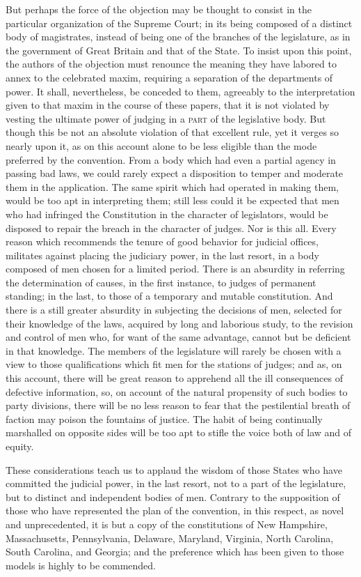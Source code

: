 But perhaps the force of the objection may be thought to consist in the particular organization of the Supreme Court; in its being composed of a distinct body of magistrates, instead of being one of the branches of the legislature, as in the government of Great Britain and that of the State. To insist upon this point, the authors of the objection must renounce the meaning they have labored to annex to the celebrated maxim, requiring a separation of the departments of power. It shall, nevertheless, be conceded to them, agreeably to the interpretation given to that maxim in the course of these papers, that it is not violated by vesting the ultimate power of judging in a \textsc{part }of the legislative body. But though this be not an absolute violation of that excellent rule, yet it verges so nearly upon it, as on this account alone to be less eligible than the mode preferred by the convention. From a body which had even a partial agency in passing bad laws, we could rarely expect a disposition to temper and moderate them in the application. The same spirit which had operated in making them, would be too apt in interpreting them; still less could it be expected that men who had infringed the Constitution in the character of legislators, would be disposed to repair the breach in the character of judges. Nor is this all. Every reason which recommends the tenure of good behavior for judicial offices, militates against placing the judiciary power, in the last resort, in a body composed of men chosen for a limited period. There is an absurdity in referring the determination of causes, in the first instance, to judges of permanent standing; in the last, to those of a temporary and mutable constitution. And there is a still greater absurdity in subjecting the decisions of men, selected for their knowledge of the laws, acquired by long and laborious study, to the revision and control of men who, for want of the same advantage, cannot but be deficient in that knowledge. The members of the legislature will rarely be chosen with a view to those qualifications which fit men for the stations of judges; and as, on this account, there will be great reason to apprehend all the ill consequences of defective information, so, on account of the natural propensity of such bodies to party divisions, there will be no less reason to fear that the pestilential breath of faction may poison the fountains of justice. The habit of being continually marshalled on opposite sides will be too apt to stifle the voice both of law and of equity.

These considerations teach us to applaud the wisdom of those States who have committed the judicial power, in the last resort, not to a part of the legislature, but to distinct and independent bodies of men. Contrary to the supposition of those who have represented the plan of the convention, in this respect, as novel and unprecedented, it is but a copy of the constitutions of New Hampshire, Massachusetts, Pennsylvania, Delaware, Maryland, Virginia, North Carolina, South Carolina, and Georgia; and the preference which has been given to those models is highly to be commended.

